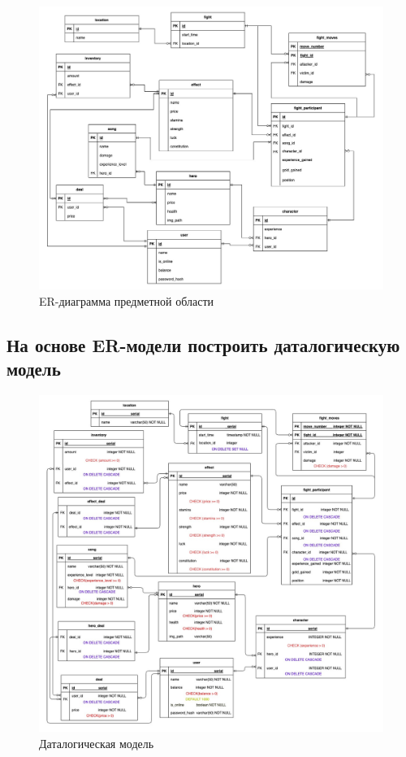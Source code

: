 \begin{figure}[H]
	\begin{center}
		\includegraphics[scale=0.46]{images/ER.jpg}
		\caption{ER-диаграмма предметной области}
	\end{center}
\end{figure}

\subsection*{На основе ER-модели построить даталогическую модель}


\begin{figure}[H]
	\begin{center}
		\includegraphics[scale=0.44]{images/Datalogical.jpg}
		\caption{Даталогическая модель}
		\label{pic:pic_name} %
	\end{center}
\end{figure}

